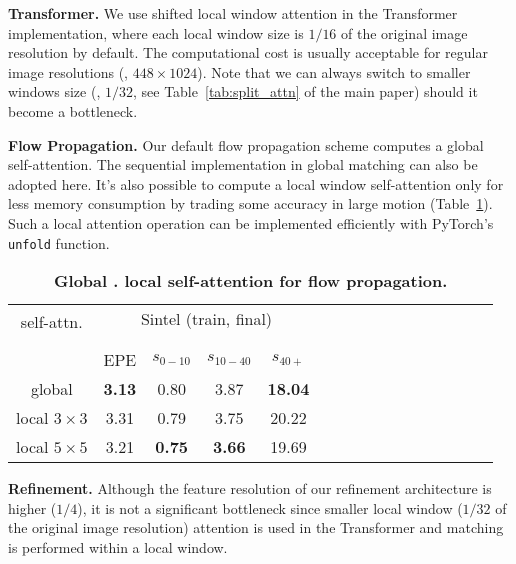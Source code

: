 \documentclass[10pt,twocolumn,letterpaper]{article}
\begin{document}
{\bf Transformer.} We use shifted local window attention \cite{liu2021Swin} in the Transformer implementation, where each local window size is $1/16$ of the original image resolution by default. The computational cost is usually acceptable for regular image resolutions (\eg, $448 \times 1024$). Note that we can always switch to smaller windows size (\eg, $1/32$, see Table~\ref{tab:split_attn} of the main paper) should it become a bottleneck.



{\bf Flow Propagation.} Our default flow propagation scheme computes a global self-attention. The sequential implementation in global matching can also be adopted here. It's also possible to compute a local window self-attention only for less memory consumption by trading some accuracy in large motion (Table~\ref{tab:global_local_prop}). Such a local attention operation can be implemented efficiently with PyTorch's \texttt{unfold} function.



\begin{table}[H]
    \centering
    \setlength{\tabcolsep}{3.pt} \begin{tabular}{cccccccccccccccc}
    \toprule
    
    \multirow{2}{*}[-2pt]{self-attn.} & \multicolumn{4}{c}{Sintel (train, final)}  & \\
    \addlinespace[-12pt] \\
    \cmidrule(lr){2-5} 
    \addlinespace[-12pt] \\
    & EPE & $s_{0-10}$ & $s_{10-40}$ & $s_{40+}$  \\
    \midrule
    
    global & \textbf{3.13} & 0.80 & 3.87 & \textbf{18.04} \\
    local $3 \times 3$ & 3.31 & 0.79 & 3.75 & 20.22 \\
    local $5 \times 5$ & 3.21 & \textbf{0.75} & \textbf{3.66} & 19.69 \\

    \bottomrule
    \end{tabular}
    \vspace{-5pt}
    \caption{\textbf{Global \vs. local self-attention for flow propagation.}
    }
    \label{tab:global_local_prop}
    \vspace{-10pt}
    
\end{table}




{\bf Refinement.} Although the feature resolution of our refinement architecture is higher ($1/4$), it is not a significant bottleneck since smaller local window ($1/32$ of the original image resolution) attention is used in the Transformer and matching is performed within a local window.
\end{document}
